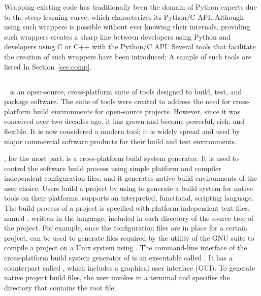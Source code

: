 Wrapping existing code has traditionally been the domain of Python
experts due to the steep learning curve, which characterizes its
Python/C API. Although using such wrappers is possible without ever
knowing their internals, providing such wrappers creates a sharp line
between developers using Python and developers using C or C++ with
the Python/C API. Several tools that facilitate the creation of such
wrappers have been introduced; A sample of such tools are listed In
Section~\ref{sec:comp}.

\subsection{\cmake}
\label{ssec:intro:cmake}
\cmake{}~\cite{mh-mc-08} is an open-source, cross-platform suite of
tools designed to build, test, and package software. The suite of
\cmake{} tools were created to address the need for cross-platform
build environments for open-source projects. However, since it was
conceived over two decades ago, it has grown and become powerful,
rich, and flexible. It is now considered a modern tool; it is widely
spread and used by major commercial software products for their build
and test environments.

\cmake{}, for the most part, is a cross-platform build system
generator.  It is used to control the software build process using
simple platform and compiler independent configuration files, and it
generates native build environments of the user choice. Users build a
project by using \cmake{} to generate a build system for native tools
on their platforms. \cmake{} supports an interpreted, functional,
scripting language. The build process of a project is specified with
platform-independent \cmake{} text files, named
, written in the \cmake{} language,
included in each directory of the source tree of the project. For
example, once the \cmake{} configuration files are in place for a
certain project, \cmake{} can be used to generate
 files required by the 
utility of the GNU suite to compile a project on a Unix system using
. The command-line interface of the cross-platform
build system generator of \cmake{} is an executable called
. It has a counterpart called
, which includes a graphical user interface
(GUI). To generate native project build files, the user invokes
 in a terminal and specifies the directory that
contains the root  file.

